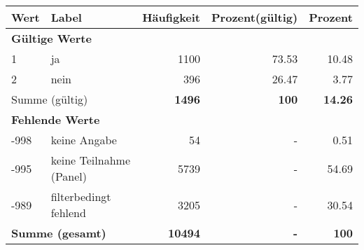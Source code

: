      \begin{longtable}{lXrrr}
     \toprule
     \textbf{Wert} & \textbf{Label} & \textbf{Häufigkeit} & \textbf{Prozent(gültig)} & \textbf{Prozent} \\
     \endhead
     \midrule
     \multicolumn{5}{l}{\textbf{Gültige Werte}}\\

     1 &
     \multicolumn{1}{X}{ ja   } &


       \num{1100} &
       \num[round-mode=places,round-precision=2]{73.53} &
         \num[round-mode=places,round-precision=2]{10.48} \\

     2 &
     \multicolumn{1}{X}{ nein   } &


       \num{396} &
       \num[round-mode=places,round-precision=2]{26.47} &
         \num[round-mode=places,round-precision=2]{3.77} \\
     \midrule
     \multicolumn{2}{l}{Summe (gültig)} &
       \textbf{\num{1496}} &
     \textbf{\num{100}} &
       \textbf{\num[round-mode=places,round-precision=2]{14.26}} \\
     \multicolumn{5}{l}{\textbf{Fehlende Werte}}\\
       -998 &
       keine Angabe &
         \num{54} &
        - &
         \num[round-mode=places,round-precision=2]{0.51} \\
       -995 &
       keine Teilnahme (Panel) &
         \num{5739} &
        - &
         \num[round-mode=places,round-precision=2]{54.69} \\
       -989 &
       filterbedingt fehlend &
         \num{3205} &
        - &
         \num[round-mode=places,round-precision=2]{30.54} \\
     \midrule
     \multicolumn{2}{l}{\textbf{Summe (gesamt)}} &
          \textbf{\num{10494}} &
        \textbf{-} &
        \textbf{\num{100}} \\
     \bottomrule
     \end{longtable}
     
